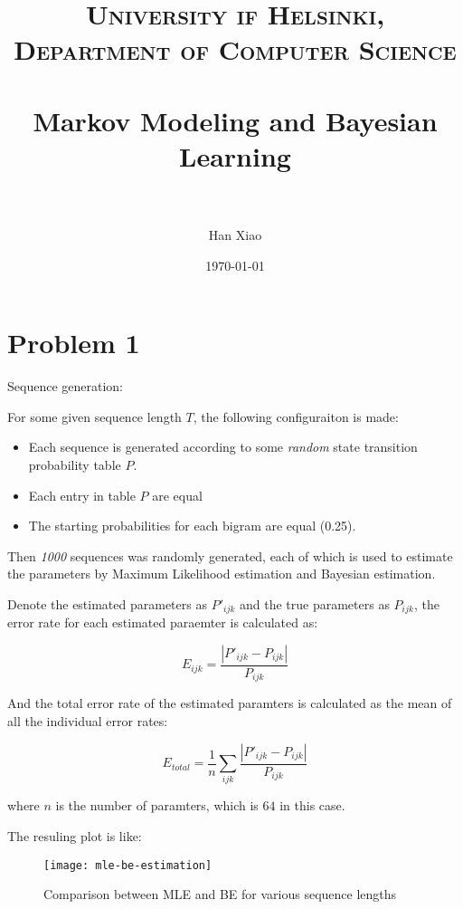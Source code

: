 \documentclass[paper=a4, fontsize=11pt]{scrartcl} %
\title{	
\normalfont \normalsize 
\textsc{University if Helsinki, Department of Computer Science} \\ [25pt] %
\horrule{0.5pt} \\[0.4cm] %
\huge Markov Modeling and Bayesian Learning \\ %
\horrule{2pt} \\[0.5cm] %
}
\author{Han Xiao} %
\date{\normalsize\today} %
\numberwithin{equation}{section} %
\numberwithin{figure}{section} %
\numberwithin{table}{section} %
\begin{document}
\maketitle %


\section{Problem 1}

\lipsum[2] %

Sequence generation:

For some given sequence length $T$, the following configuraiton is made:

\begin {itemize}
  \item Each sequence is generated according to some {\em random} state transition probability table $P$.
  \item Each entry in table $P$ are equal
  \item The starting probabilities for each bigram are equal (0.25).
\end {itemize}


Then {\em 1000} sequences was randomly generated, each of which is used to estimate the parameters by Maximum Likelihood estimation and Bayesian estimation.

Denote the estimated parameters as $P'_{ijk}$ and the true parameters as $P_{ijk}$, the error rate for each estimated paraemter is calculated as:

\[ E_{ijk} = \frac{|P'_{ijk} - P_{ijk}|} {P_{ijk}} \]

And the total error rate of the estimated paramters is calculated as the mean of all the individual error rates:

\[E_{total} = \frac {1} {n} \sum\limits_{ijk} \frac{|P'_{ijk} - P_{ijk}| }{ P_{ijk}}\]

where $n$ is the number of paramters, which is $64$ in this case.

The resuling plot is like: 

\begin{figure}[H]
  \centering
  \texttt{[image: mle-be-estimation]}
  \caption{Comparison between MLE and BE for various sequence lengths}
\end{figure}
\end{document}
